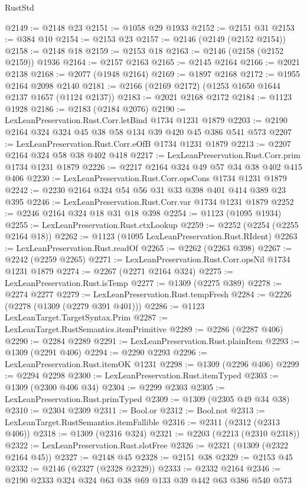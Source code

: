 \begin{lexlean}{RustStd}
\begin{coremodule}
@2149 := @2148 @23
@2151 := @1058 @29 @1933
@2152 := @2151 @31
@2153 := @384 @10
@2154 := @2153 @23
@2157 := @2146 (@2149 (@2152 @2154))
@2158 := @2148 @18
@2159 := @2153 @18
@2163 := @2146 (@2158 (@2152 @2159)) @1936
@2164 := @2157 @2163
@2165 := @2145 @2164
@2166 := @2021 @2138
@2168 := @2077 (@1948 @2164)
@2169 := @1897 @2168
@2172 := @1955 @2164 @2098 @2140
@2181 := @2166 (@2169 @2172) (@1253 @1650 @1644 @2137 @1657 (@1124 @2137))
@2183 := @2021 @2168 @2172
@2184 := @1123 @1928
@2186 := @2183 (@2184 @2076)
@2190 := LexLeanPreservation.Rust.Corr.letBind @1734 @1231 @1879
@2203 := @2190 @2164 @324 @324 @45 @38 @58 @134 @39 @420 @45 @386 @541 @573
@2207 := LexLeanPreservation.Rust.Corr.eOfB @1734 @1231 @1879
@2213 := @2207 @2164 @324 @58 @38 @402 @418
@2217 := LexLeanPreservation.Rust.Corr.prim @1734 @1231 @1879
@2226 := @2217 @2164 @324 @49 @57 @34 @38 @402 @415 @406
@2230 := LexLeanPreservation.Rust.Corr.opsCons @1734 @1231 @1879
@2242 := @2230 @2164 @324 @54 @56 @31 @33 @398 @401 @414 @389 @23 @395
@2246 := LexLeanPreservation.Rust.Corr.var @1734 @1231 @1879
@2252 := @2246 @2164 @324 @18 @31 @18 @398
@2254 := @1123 (@1095 @1934)
@2255 := LexLeanPreservation.Rust.ctxLookup
@2259 := @2252 (@2254 (@2255 @2164 @18))
@2262 := @1123 (@1095 LexLeanPreservation.Rust.RIdent)
@2263 := LexLeanPreservation.Rust.readOf
@2265 := @2262 (@2263 @398)
@2267 := @2242 (@2259 @2265)
@2271 := LexLeanPreservation.Rust.Corr.opsNil @1734 @1231 @1879
@2274 := @2267 (@2271 @2164 @324)
@2275 := LexLeanPreservation.Rust.isTemp
@2277 := @1309 (@2275 @389)
@2278 := @2274 @2277
@2279 := LexLeanPreservation.Rust.tempFresh
@2284 := @2226 (@2278 (@1309 (@2279 @391 @401)))
@2286 := @1123 LexLeanTarget.TargetSyntax.Prim
@2287 := LexLeanTarget.RustSemantics.itemPrimitive
@2289 := @2286 (@2287 @406)
@2290 := @2284 @2289
@2291 := LexLeanPreservation.Rust.plainItem
@2293 := @1309 (@2291 @406)
@2294 := @2290 @2293
@2296 := LexLeanPreservation.Rust.itemOK @1231
@2298 := @1309 (@2296 @406)
@2299 := @2294 @2298
@2300 := LexLeanPreservation.Rust.itemTyped
@2303 := @1309 (@2300 @406 @34)
@2304 := @2299 @2303
@2305 := LexLeanPreservation.Rust.primTyped
@2309 := @1309 (@2305 @49 @34 @38)
@2310 := @2304 @2309
@2311 := Bool.or
@2312 := Bool.not
@2313 := LexLeanTarget.RustSemantics.itemFallible
@2316 := @2311 (@2312 (@2313 @406))
@2318 := @1309 (@2316 @324)
@2321 := @2203 (@2213 (@2310 @2318))
@2322 := LexLeanPreservation.Rust.slotFree
@2326 := @2321 (@1309 (@2322 @2164 @45))
@2327 := @2148 @45
@2328 := @2151 @38
@2329 := @2153 @45
@2332 := @2146 (@2327 (@2328 @2329))
@2333 := @2332 @2164
@2346 := @2190 @2333 @324 @324 @63 @38 @69 @133 @39 @442 @63 @386 @540 @573

\end{coremodule}
\end{lexlean}
